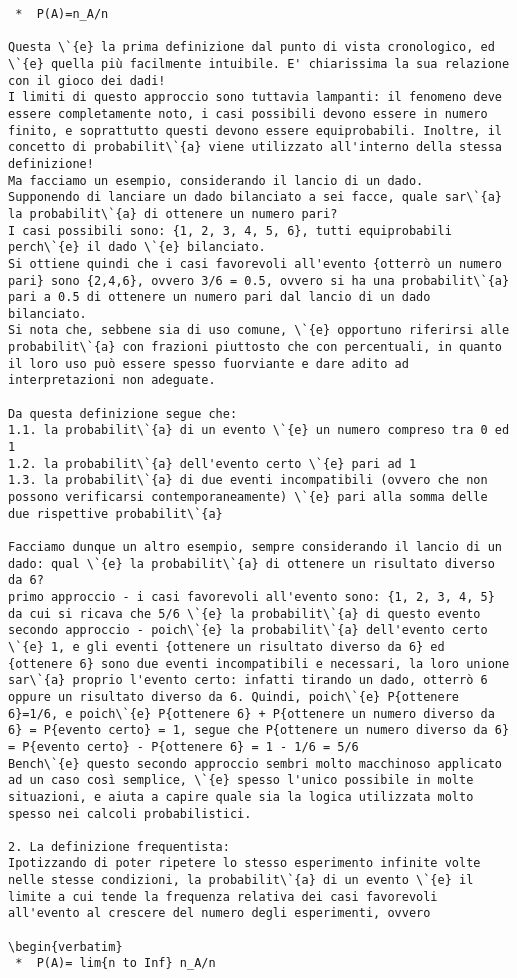 \documentclass{book}
\begin{document}
\begin{verbatim}
 *	P(A)=n_A/n

Questa \`{e} la prima definizione dal punto di vista cronologico, ed \`{e} quella più facilmente intuibile. E' chiarissima la sua relazione con il gioco dei dadi!
I limiti di questo approccio sono tuttavia lampanti: il fenomeno deve essere completamente noto, i casi possibili devono essere in numero finito, e soprattutto questi devono essere equiprobabili. Inoltre, il concetto di probabilit\`{a} viene utilizzato all'interno della stessa definizione!
Ma facciamo un esempio, considerando il lancio di un dado.
Supponendo di lanciare un dado bilanciato a sei facce, quale sar\`{a} la probabilit\`{a} di ottenere un numero pari?
I casi possibili sono: {1, 2, 3, 4, 5, 6}, tutti equiprobabili perch\`{e} il dado \`{e} bilanciato.
Si ottiene quindi che i casi favorevoli all'evento {otterrò un numero pari} sono {2,4,6}, ovvero 3/6 = 0.5, ovvero si ha una probabilit\`{a} pari a 0.5 di ottenere un numero pari dal lancio di un dado bilanciato.
Si nota che, sebbene sia di uso comune, \`{e} opportuno riferirsi alle probabilit\`{a} con frazioni piuttosto che con percentuali, in quanto il loro uso può essere spesso fuorviante e dare adito ad interpretazioni non adeguate.

Da questa definizione segue che:
1.1. la probabilit\`{a} di un evento \`{e} un numero compreso tra 0 ed 1
1.2. la probabilit\`{a} dell'evento certo \`{e} pari ad 1
1.3. la probabilit\`{a} di due eventi incompatibili (ovvero che non possono verificarsi contemporaneamente) \`{e} pari alla somma delle due rispettive probabilit\`{a}

Facciamo dunque un altro esempio, sempre considerando il lancio di un dado: qual \`{e} la probabilit\`{a} di ottenere un risultato diverso da 6?
primo approccio - i casi favorevoli all'evento sono: {1, 2, 3, 4, 5} da cui si ricava che 5/6 \`{e} la probabilit\`{a} di questo evento
secondo approccio - poich\`{e} la probabilit\`{a} dell'evento certo \`{e} 1, e gli eventi {ottenere un risultato diverso da 6} ed {ottenere 6} sono due eventi incompatibili e necessari, la loro unione sar\`{a} proprio l'evento certo: infatti tirando un dado, otterrò 6 oppure un risultato diverso da 6. Quindi, poich\`{e} P{ottenere 6}=1/6, e poich\`{e} P{ottenere 6} + P{ottenere un numero diverso da 6} = P{evento certo} = 1, segue che P{ottenere un numero diverso da 6} = P{evento certo} - P{ottenere 6} = 1 - 1/6 = 5/6
Bench\`{e} questo secondo approccio sembri molto macchinoso applicato ad un caso così semplice, \`{e} spesso l'unico possibile in molte situazioni, e aiuta a capire quale sia la logica utilizzata molto spesso nei calcoli probabilistici.

2. La definizione frequentista:
Ipotizzando di poter ripetere lo stesso esperimento infinite volte nelle stesse condizioni, la probabilit\`{a} di un evento \`{e} il limite a cui tende la frequenza relativa dei casi favorevoli all'evento al crescere del numero degli esperimenti, ovvero

\begin{verbatim}
 *	P(A)= lim{n to Inf} n_A/n
\end{verbatim}
\end{document}
